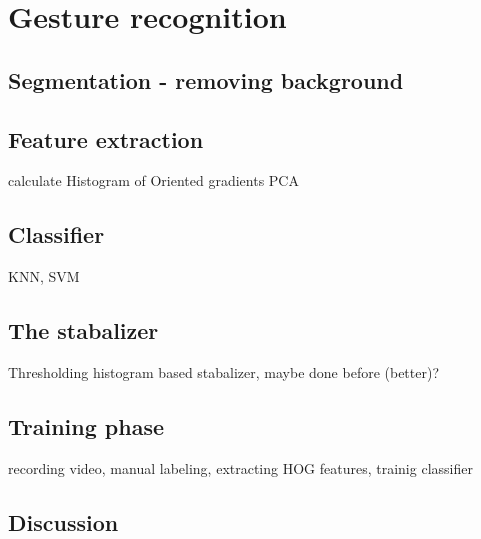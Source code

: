 
\chapter{Gesture recognition}
\label{ch:gestures}


\section{Segmentation - removing background}

\section{Feature extraction}
calculate Histogram of Oriented gradients\cite{watanabe2009}
PCA

\section{Classifier}
KNN,  SVM

\section{The stabalizer}
Thresholding histogram based stabalizer, maybe done before (better)?

\section{Training phase}
recording video, manual labeling, extracting HOG features, trainig classifier

\section{Discussion}